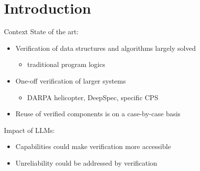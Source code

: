 \documentclass[aspectratio=1610,mathserif]{beamer}
\begin{document}
\frame\tableofcontents

\section{Introduction} %
\frame\sectionpage

\begin{frame}{Context} %
  State of the art:
  \begin{itemize}
    \item Verification of data structures and algorithms largely solved
    \begin{itemize}
      \item traditional program logics
    \end{itemize}
    \pause
    \item One-off verification of larger systems
    \begin{itemize}
      \item DARPA helicopter, DeepSpec, specific CPS
    \end{itemize}
    \pause
    \item Reuse of verified components is on a case-by-case basis
  \end{itemize}

  \vfill\pause
  Impact of LLMs:
  \begin{itemize}
    \item Capabilities could make verification more accessible
    \item Unreliability could be addressed by verification
  \end{itemize}
\end{frame}
\end{document}
